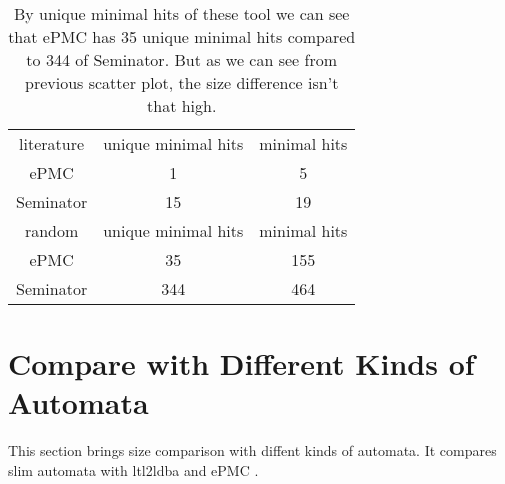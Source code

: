 \documentclass[
	digital,
nolof, nolot
]{fithesis3}
\begin{document}
\begin{table}[ht]
	\centering
	\caption{By unique minimal hits of these tool we can see that ePMC has 35 unique minimal hits compared to 344 of Seminator. But as we can see from previous scatter plot, the size difference isn't that high.}
	\begin{tabular}{ |c||c|c| } 
		\hline
		literature&unique minimal hits&minimal hits\\
		\hhline{|===|}
		ePMC&1 & 5\\
		\hline
		Seminator &15 & 19\\ 
		\hline
		\hline
		random&unique minimal hits&minimal hits\\
		\hhline{|===|}
		ePMC&35 & 155\\
		\hline
		Seminator &344 & 464\\ 
		\hline
	\end{tabular}
\end{table}
		
	
	
	
		
		

	\clearpage
		\section{Compare with Different Kinds of Automata}
		This section brings size comparison with diffent kinds of automata. It compares slim automata with ltl2ldba \cite{ltl2ldba} and ePMC \cite{epmc}.
		
\end{document}
